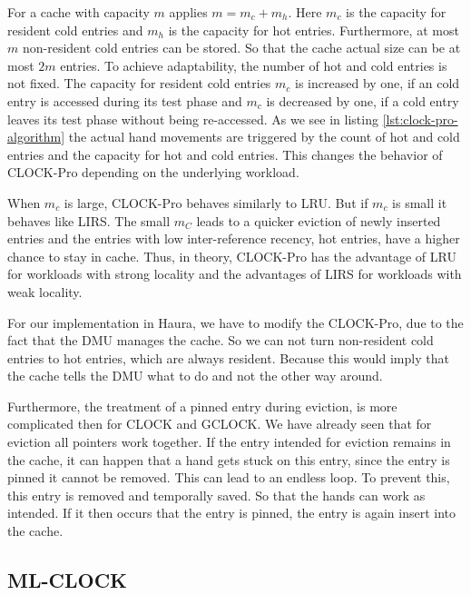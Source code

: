 \documentclass[
	12pt,
	a4paper,
	abstract,
	bibliography=totoc,
	chapterprefix,
	headings=openright,
	numbers=endperiod,
	parskip=half,
	twoside,
]{scrreprt}
\begin{document}
For a cache with capacity $m$ applies $m = m_c + m_h$.
Here $m_c$ is the capacity for resident cold entries and $m_h$ is the capacity for hot entries.
Furthermore, at most $m$ non-resident cold entries can be stored.
So that the cache actual size can be at most $2m$ entries.
To achieve adaptability, the number of hot and cold entries is not fixed.
The capacity for resident cold entries $m_c$ is increased by one, if an cold entry is accessed during its test phase 
and $m_c$ is decreased by one, if a cold entry leaves its test phase without being re-accessed.
As we see in listing \ref{lst:clock-pro-algorithm} the actual hand movements are triggered by the count of hot and cold entries and the 
capacity for hot and cold entries.
This changes the behavior of CLOCK-Pro depending on the underlying workload.

When $m_c$ is large, CLOCK-Pro behaves similarly to LRU. But if $m_c$ is small it behaves like LIRS.
The small $m_C$ leads to a quicker eviction of newly inserted entries and the entries with low inter-reference recency, hot entries, have a higher 
chance to stay in cache. Thus, in theory, CLOCK-Pro has the advantage of LRU for workloads with strong locality and 
the advantages of LIRS for workloads with weak locality.

For our implementation in Haura, we have to modify the CLOCK-Pro, due to the fact that the DMU manages the cache.
So we can not turn non-resident cold entries to hot entries, which are always resident.
Because this would imply that the cache tells the DMU what to do and not the other way around.

Furthermore, the treatment of a pinned entry during eviction, is more complicated then for CLOCK and GCLOCK.
We have already seen that for eviction all pointers work together. If the entry intended for eviction remains in the cache, it can happen that a 
hand gets stuck on this entry, since the entry is pinned it cannot be removed. This can lead to an endless loop. To prevent this, this entry is 
removed and temporally saved. So that the hands can work as intended.
If it then occurs that the entry is pinned, the entry is again insert into the cache.

\subsection{ML-CLOCK}
\label{sub:ml-clock}
\end{document}
